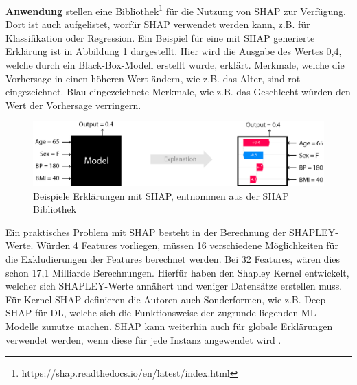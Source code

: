 \textbf{Anwendung}
\textcite{lundberg2017unified} stellen eine Bibliothek\footnote{https://shap.readthedocs.io/en/latest/index.html} für die Nutzung von SHAP zur Verfügung. Dort ist auch aufgelistet, worfür SHAP verwendet werden kann, z.B. für Klassifikation oder Regression. Ein Beispiel für eine mit SHAP generierte Erklärung ist in Abbildung \ref{Fig:Beispiel_Shap} dargestellt. Hier wird die Ausgabe des Wertes 0,4, welche durch ein Black-Box-Modell erstellt wurde, erklärt. Merkmale, welche die Vorhersage in einen höheren Wert ändern, wie z.B. das Alter, sind rot eingezeichnet. Blau eingezeichnete Merkmale, wie z.B. das Geschlecht würden den Wert der Vorhersage verringern.
\begin{figure}
    \centering
    \includegraphics[scale=0.45]{pic/MA-Bilder/Literaturrecherche/SHAP-Beispiel.PNG}
    \caption{Beispiele Erklärungen mit SHAP, entnommen aus der SHAP Bibliothek}
    \label{Fig:Beispiel_Shap}
\end{figure}
Ein praktisches Problem mit SHAP besteht in der Berechnung der SHAPLEY-Werte. Würden 4 Features vorliegen, müssen 16 verschiedene Möglichkeiten für die Exkludierungen der Features berechnet werden. Bei 32 Features, wären dies schon 17,1 Milliarde Berechnungen. Hierfür haben \textcite{lundberg2017unified} den Shapley Kernel entwickelt, welcher sich SHAPLEY-Werte annähert und weniger Datensätze erstellen muss. Für Kernel SHAP definieren die Autoren auch Sonderformen, wie z.B. Deep SHAP für DL, welche sich die Funktionsweise der zugrunde liegenden ML-Modelle zunutze machen.
SHAP kann weiterhin auch für globale Erklärungen verwendet werden, wenn diese für jede Instanz angewendet wird \cite{molnar2022}.

